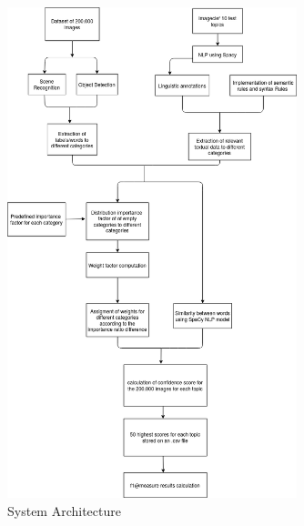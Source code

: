 \begin{figure}[H]
    \centering
    \captionsetup{justification=centering}
    \includegraphics[width = 0.75\textwidth]{Sections/6textprocessing/images/diagram.png}
    \caption{System Architecture}
    \label{fig:testtopic}
  \end{figure}




  